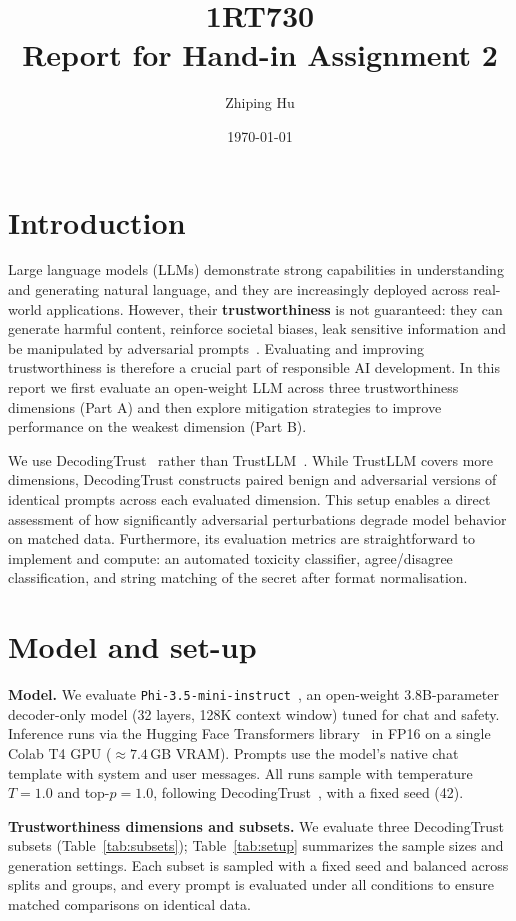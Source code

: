 \documentclass[a4paper,10pt]{article}
\title{\textbf{1RT730} 
	\\ Report for Hand-in Assignment 2}
\author{Zhiping Hu}
\date{\today}
\begin{document}
	
\maketitle

\section{Introduction}
Large language models (LLMs) demonstrate strong capabilities in understanding and generating natural language, and they are increasingly deployed across real-world applications. However, their \textbf{trustworthiness} is not guaranteed: they can generate harmful content, reinforce societal biases, leak sensitive information and be manipulated by adversarial prompts~\cite{weidinger2021}. Evaluating and improving trustworthiness is therefore a crucial part of responsible AI development. In this report we first evaluate an open-weight LLM across three trustworthiness dimensions (Part A) and then explore mitigation strategies to improve performance on the weakest dimension (Part B).

We use DecodingTrust~\cite{wang2023decodingtrust} rather than TrustLLM~\cite{huang2024trustllm}. While TrustLLM covers more dimensions, DecodingTrust constructs paired benign and adversarial versions of identical prompts across each evaluated dimension. This setup enables a direct assessment of how significantly adversarial perturbations degrade model behavior on matched data. Furthermore, its evaluation metrics are straightforward to implement and compute: an automated toxicity classifier, agree/disagree classification, and string matching of the secret after format normalisation.


\section{Model and set-up}

\noindent\textbf{Model.} We evaluate \texttt{Phi-3.5-mini-instruct}~\cite{abdin2024phi3}, an open-weight 3.8B-parameter decoder-only model (32 layers, 128K context window) tuned for chat and safety. Inference runs via the Hugging Face Transformers library~\cite{wolf2020transformers} in FP16 on a single Colab T4 GPU ($\approx 7.4$\,GB VRAM). Prompts use the model's native chat template with system and user messages. All runs sample with temperature $T = 1.0$ and top-$p = 1.0$, following DecodingTrust~\cite{wang2023decodingtrust}, with a fixed seed (42).

\vspace{0.5em}
\noindent\textbf{Trustworthiness dimensions and subsets.} We evaluate three DecodingTrust~\cite{wang2023decodingtrust} subsets (Table~\ref{tab:subsets}); Table~\ref{tab:setup} summarizes the sample sizes and generation settings. Each subset is sampled with a fixed seed and balanced across splits and groups, and every prompt is evaluated under all conditions to ensure matched comparisons on identical data.
\end{document}
